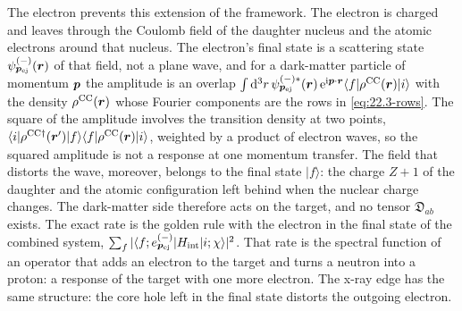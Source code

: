 The electron prevents this extension of the framework. The electron is charged and leaves through the Coulomb field of the daughter nucleus and the atomic electrons around that nucleus. The electron's final state is a scattering state $\psi^{(-)}_{\bm{p}_{\mathrm{ej}}}(\bm{r})$ of that field, not a plane wave, and for a dark-matter particle of momentum $\bm{p}$ the amplitude is an overlap $\int\mathrm{d}^3r\,\psi^{(-)*}_{\bm{p}_{\mathrm{ej}}}(\bm{r})\,\mathrm{e}^{\mathrm{i}\bm{p}\cdot\bm{r}}\langle f|\rho^{\mathrm{CC}}(\bm{r})|i\rangle$ with the density $\rho^{\mathrm{CC}}(\bm{r})$ whose Fourier components are the rows in \cref{eq:22.3-rows}. The square of the amplitude involves the transition density at two points, $\langle i|\rho^{\mathrm{CC}\dagger}(\bm{r}')|f\rangle\langle f|\rho^{\mathrm{CC}}(\bm{r})|i\rangle$, weighted by a product of electron waves, so the squared amplitude is not a response at one momentum transfer. The field that distorts the wave, moreover, belongs to the final state $|f\rangle$: the charge $Z + 1$ of the daughter and the atomic configuration left behind when the nuclear charge changes. The dark-matter side therefore acts on the target, and no tensor $\mathfrak{D}_{ab}$ exists. The exact rate is the golden rule with the electron in the final state of the combined system, $\sum_f|\langle f; e^{(-)}_{\bm{p}_{\mathrm{ej}}}|H_{\mathrm{int}}|i; \chi\rangle|^2$. That rate is the spectral function of an operator that adds an electron to the target and turns a neutron into a proton: a response of the target with one more electron. The x-ray edge has the same structure: the core hole left in the final state distorts the outgoing electron.

